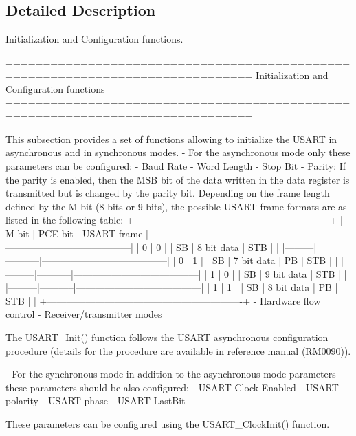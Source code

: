 \subsection{Detailed Description}
Initialization and Configuration functions. \begin{DoxyVerb} ===============================================================================
                  Initialization and Configuration functions
 ===============================================================================  

  This subsection provides a set of functions allowing to initialize the USART 
  in asynchronous and in synchronous modes.
   - For the asynchronous mode only these parameters can be configured: 
        - Baud Rate
        - Word Length 
        - Stop Bit
        - Parity: If the parity is enabled, then the MSB bit of the data written
          in the data register is transmitted but is changed by the parity bit.
          Depending on the frame length defined by the M bit (8-bits or 9-bits),
          the possible USART frame formats are as listed in the following table:
   +-------------------------------------------------------------+     
   |   M bit |  PCE bit  |            USART frame                |
   |---------------------|---------------------------------------|             
   |    0    |    0      |    | SB | 8 bit data | STB |          |
   |---------|-----------|---------------------------------------|  
   |    0    |    1      |    | SB | 7 bit data | PB | STB |     |
   |---------|-----------|---------------------------------------|  
   |    1    |    0      |    | SB | 9 bit data | STB |          |
   |---------|-----------|---------------------------------------|  
   |    1    |    1      |    | SB | 8 bit data | PB | STB |     |
   +-------------------------------------------------------------+            
        - Hardware flow control
        - Receiver/transmitter modes

  The USART_Init() function follows the USART  asynchronous configuration procedure
  (details for the procedure are available in reference manual (RM0090)).

  - For the synchronous mode in addition to the asynchronous mode parameters these 
    parameters should be also configured:
        - USART Clock Enabled
        - USART polarity
        - USART phase
        - USART LastBit
  
  These parameters can be configured using the USART_ClockInit() function.\end{DoxyVerb}
 

